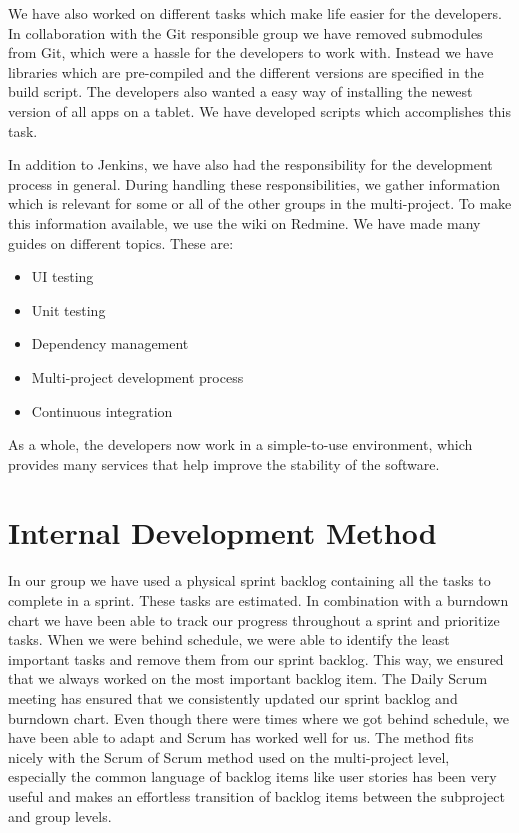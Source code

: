 We have also worked on different tasks which make life easier for the developers. In collaboration with the Git responsible group we have removed submodules from Git, which were a hassle for the developers to work with. Instead we have libraries which are pre-compiled and the different versions are specified in the build script. The developers also wanted a easy way of installing the newest version of all apps on a tablet. We have developed scripts which accomplishes this task.

In addition to Jenkins, we have also had the responsibility for the development process in general. During handling these responsibilities, we gather information which is relevant for some or all of the other groups in the multi-project. To make this information available, we use the wiki on Redmine. We have made many guides on different topics. These are:

\begin{itemize}
  \item UI testing
  \item Unit testing
  \item Dependency management
  \item Multi-project development process
  \item Continuous integration
\end{itemize}

As a whole, the developers now work in a simple-to-use environment, which provides many services that help improve the stability of the software.

\section{Internal Development Method}\label{conc:internalprocess}
In our group we have used a physical sprint backlog containing all the tasks to complete in a sprint. These tasks are estimated. In combination with a burndown chart we have been able to track our progress throughout a sprint and prioritize tasks. When we were behind schedule, we were able to identify the least important tasks and remove them from our sprint backlog. This way, we ensured that we always worked on the most important backlog item. The Daily Scrum meeting has ensured that we consistently updated our sprint backlog and burndown chart. Even though there were times where we got behind schedule, we have been able to adapt and Scrum has worked well for us. The method fits nicely with the Scrum of Scrum method used on the multi-project level, especially the common language of backlog items like user stories has been very useful and makes an effortless transition of backlog items between the subproject and group levels.

